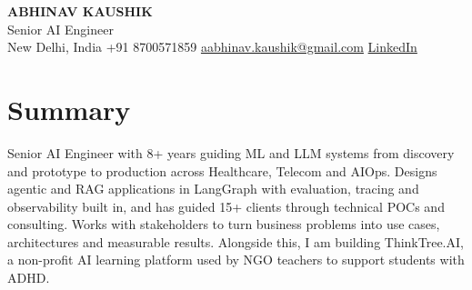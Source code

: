 \documentclass[10pt,a4paper]{article}
\begin{document}
\begin{center}
  {\LARGE\bfseries ABHINAV KAUSHIK}\\[2pt]
  {\large Senior AI Engineer}\\[2pt]
  New Delhi, India \textbar{} +91 8700571859 \textbar{} \href{mailto:aabhinav.kaushik@gmail.com}{aabhinav.kaushik@gmail.com} \textbar{} \href{https://www.linkedin.com/in/abhinav-kaushik10/}{LinkedIn}  
\end{center}

\section{Summary}
Senior AI Engineer with 8+ years guiding ML and LLM systems from discovery and prototype to production across Healthcare, Telecom and AIOps. Designs agentic and RAG applications in LangGraph with evaluation, tracing and observability built in, and has guided 15+ clients through technical POCs and consulting. Works with stakeholders to turn business problems into use cases, architectures and measurable results. Alongside this, I am building ThinkTree.AI, a non-profit AI learning platform used by NGO teachers to support students with ADHD.
\end{document}
